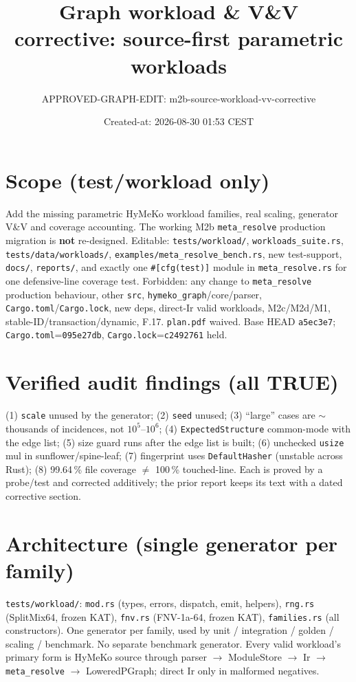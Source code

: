 \documentclass[11pt]{article}
\title{Graph workload \& V\&V corrective: source-first parametric workloads}
\author{APPROVED-GRAPH-EDIT: m2b-source-workload-vv-corrective}
\date{Created-at: 2026-08-30 01:53 CEST}
\begin{document}
\maketitle

\section*{Scope (test/workload only)}
Add the missing parametric HyMeKo workload families, real scaling, generator
V\&V and coverage accounting. The working M2b \texttt{meta\_resolve} production
migration is \textbf{not} re-designed. Editable: \texttt{tests/workload/},
\texttt{workloads\_suite.rs}, \texttt{tests/data/workloads/},
\texttt{examples/meta\_resolve\_bench.rs}, new test-support, \texttt{docs/},
\texttt{reports/}, and exactly one \texttt{\#[cfg(test)]} module in
\texttt{meta\_resolve.rs} for one defensive-line coverage test. Forbidden: any
change to \texttt{meta\_resolve} production behaviour, other \texttt{src},
\texttt{hymeko\_graph}/core/parser, \texttt{Cargo.toml}/\texttt{Cargo.lock}, new
deps, direct-Ir valid workloads, M2c/M2d/M1, stable-ID/transaction/dynamic,
F.17. \texttt{plan.pdf} waived. Base HEAD \texttt{a5ec3e7};
\texttt{Cargo.toml}=\texttt{095e27db}, \texttt{Cargo.lock}=\texttt{c2492761} held.

\section{Verified audit findings (all TRUE)}
(1) \texttt{scale} unused by the generator; (2) \texttt{seed} unused;
(3) ``large'' cases are $\sim$thousands of incidences, not $10^5$--$10^6$;
(4) \texttt{ExpectedStructure} common-mode with the edge list;
(5) size guard runs after the edge list is built;
(6) unchecked \texttt{usize} mul in sunflower/spine-leaf;
(7) fingerprint uses \texttt{DefaultHasher} (unstable across Rust);
(8) 99.64\,\% file coverage $\ne$ 100\,\% touched-line. Each is proved by a
probe/test and corrected additively; the prior report keeps its text with a
dated corrective section.

\section{Architecture (single generator per family)}
\texttt{tests/workload/}: \texttt{mod.rs} (types, errors, dispatch, emit, helpers),
\texttt{rng.rs} (SplitMix64, frozen KAT), \texttt{fnv.rs} (FNV-1a-64, frozen KAT),
\texttt{families.rs} (all constructors). One generator per family, used by unit /
integration / golden / scaling / benchmark. No separate benchmark generator.
Every valid workload's primary form is HyMeKo source through parser $\to$
ModuleStore $\to$ Ir $\to$ \texttt{meta\_resolve} $\to$ LoweredPGraph; direct Ir
only in malformed negatives.
\end{document}
